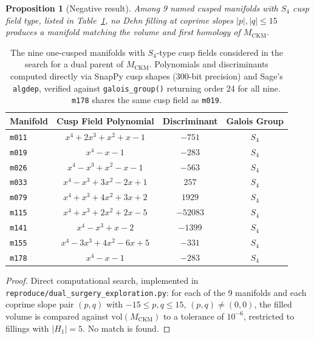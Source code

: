 \documentclass[11pt,a4paper]{article}
\newtheorem{proposition}[theorem]{Proposition}
\theoremstyle{definition}
\theoremstyle{remark}
\newcommand{\mfld}[1]{\texttt{#1}}
\newcommand{\vol}{\mathrm{vol}}
\begin{document}
\begin{proposition}[Negative result]\label{prop:ckm-negative}
Among 9 named cusped manifolds with $S_4$ cusp field type, listed
in Table~\ref{tab:s4-manifolds}, no Dehn filling at coprime slopes
$|p|,|q|\le 15$ produces a manifold matching the volume and first
homology of $M_{\mathrm{CKM}}$.
\end{proposition}

\begin{table}[htbp]
\centering
\begin{tabular}{lccc}
\toprule
Manifold & Cusp Field Polynomial & Discriminant & Galois Group \\
\midrule
\mfld{m011} & $x^4 + 2x^3 + x^2 + x - 1$ & $-751$ & $S_4$ \\
\mfld{m019} & $x^4 - x - 1$ & $-283$ & $S_4$ \\
\mfld{m026} & $x^4 - x^3 + x^2 - x - 1$ & $-563$ & $S_4$ \\
\mfld{m033} & $x^4 - x^3 + 3x^2 - 2x + 1$ & $257$ & $S_4$ \\
\mfld{m079} & $x^4 + x^3 + 4x^2 + 3x + 2$ & $1929$ & $S_4$ \\
\mfld{m115} & $x^4 + x^3 + 2x^2 + 2x - 5$ & $-52083$ & $S_4$ \\
\mfld{m141} & $x^4 - x^3 + x - 2$ & $-1399$ & $S_4$ \\
\mfld{m155} & $x^4 - 3x^3 + 4x^2 - 6x + 5$ & $-331$ & $S_4$ \\
\mfld{m178} & $x^4 - x - 1$ & $-283$ & $S_4$ \\
\bottomrule
\end{tabular}
\caption{The nine one-cusped manifolds with $S_4$-type cusp fields
considered in the search for a dual parent of $M_{\mathrm{CKM}}$.
Polynomials and discriminants computed directly via SnapPy cusp
shapes (300-bit precision) and Sage's \texttt{algdep}, verified
against \texttt{galois\_group()} returning order 24 for all nine.
\mfld{m178} shares the same cusp field as \mfld{m019}.}
\label{tab:s4-manifolds}
\end{table}

\begin{proof}
Direct computational search, implemented in
\texttt{reproduce/dual\_surgery\_exploration.py}: for each of the 9
manifolds and each coprime slope pair $(p,q)$ with
$-15\le p,q\le 15$, $(p,q)\ne(0,0)$, the filled volume is compared
against $\vol(M_{\mathrm{CKM}})$ to a tolerance of
$10^{-6}$, restricted to fillings with $|H_1|=5$. No match is
found.
\end{proof}
\end{document}
